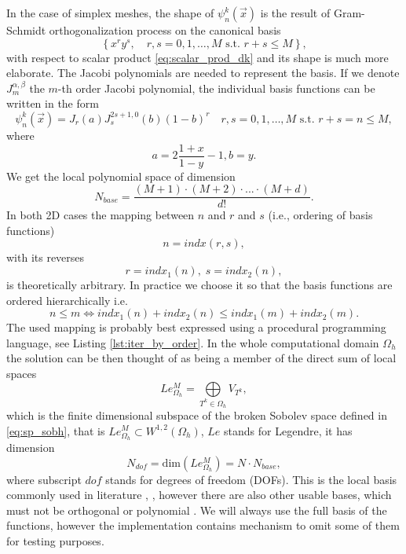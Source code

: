 In the case of simplex meshes, the shape of $\psi_n^k(\vec{x})$ is the result of
Gram-Schmidt orthogonalization process on the canonical basis
\begin{equation}
    \label{eq:tens_canon}
    \left\{ x^ry^s,  \quad r, s = 0,1, \dots, M \text{ s.t. } r + s \leq M\right\},
\end{equation}
with respect to scalar product \eqref{eq:scalar_prod_dk}
and its shape is much more elaborate. The Jacobi polynomials are needed to
represent the basis. If we denote $J^{\alpha, \beta}_m$ the $m$-th order
Jacobi polynomial, the individual basis functions can be written in the form
\cite{Hesthaven2008}
\begin{equation}
\psi_n^k(\vec{x}) = J_r(a)J^{2s+1, 0}_s(b)(1 - b)^r\quad r, s = 0,1, \dots,
M \text{ s.t. } r + s = n \leq M,
\end{equation}
where
\begin{equation}
a = 2 \frac{1 + x}{1 - y} - 1, b = y.
\end{equation}
We get the local polynomial space of dimension
\begin{equation}
N_{base} =  \frac{(M + 1) \cdot (M + 2) \cdot ... \cdot (M + d)}{d!}.
\end{equation}
In both 2D cases the mapping between $n$ and $r$ and $s$ (i.e., ordering of
basis functions)
\begin{equation}
\label{eq:bindx}
n = indx(r, s),
\end{equation}
with its reverses
\begin{equation}
r = indx_1(n),\; s = indx_2(n),
\end{equation}
is theoretically arbitrary. In practice we choose it so that the basis
functions are ordered hierarchically i.e.
\begin{equation}
n \leq m \Leftrightarrow indx_1(n) + indx_2(n) \leq indx_1(m) + indx_2(m).
\end{equation}
The used mapping is probably best expressed using a procedural programming language,
see Listing \ref{lst:iter_by_order}.
In the whole computational domain $\Omega_h$ the solution can be then thought
of as being a member of the direct sum of local spaces
\begin{equation}
Le_{\Omega_h}^{M} = \bigoplus\limits_{T^k \in \Omega_h} V_{T^k},
\end{equation}
which is the finite dimensional subspace of the broken Sobolev space defined in
\eqref{eq:sp_sobh},
that is $Le_{\Omega_h}^{M} \subset  W^{1,2}(\Omega_h)$, $Le$ stands for Legendre, it has
dimension
\begin{equation}
\label{eq:dim_legh}
N_{dof} = \text{dim}(Le_{\Omega_h}^{M}) = N\cdot N_{base},
\end{equation}
where subscript $dof$ stands for degrees of freedom (DOFs). This is the local basis commonly
used in literature \cite{Hesthaven2008}, \cite{Bokhove2008}, however there are also other
usable bases, which must not be orthogonal or polynomial \cite{Yuan2006}. We will always
use the full basis of the functions, however the implementation contains mechanism to omit
some of them for testing purposes.

